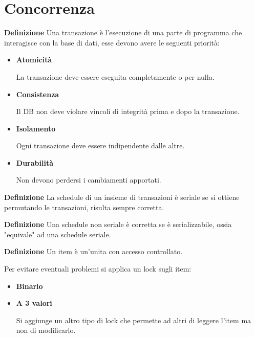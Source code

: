 \documentclass{article}
\begin{document}
\section{Concorrenza}

\textbf{Definizione} Una transazione è l'esecuzione di una parte di programma che interagisce con la base di dati, esse devono avere le seguenti priorità:
\begin{itemize}
    \item \textbf{Atomicità}

        La transazione deve essere eseguita completamente o per nulla.
    
    \item \textbf{Consistenza}

        Il DB non deve violare vincoli di integrità prima e dopo la transazione.
    
    \item \textbf{Isolamento}

        Ogni transazione deve essere indipendente dalle altre.
    
    \item \textbf{Durabilità}

        Non devono perdersi i cambiamenti apportati.\newline
    
\end{itemize}

\noindent\textbf{Definizione} La schedule di un insieme di transazioni è seriale se si ottiene permutando le transazioni, risulta sempre corretta.\newline

\noindent\textbf{Definizione} Una schedule non seriale è corretta se è serializzabile, ossia "equivale" ad una schedule seriale.\newline

\noindent\textbf{Definizione} Un item è un'unita con accesso controllato.\newline

\noindent Per evitare eventuali problemi si applica un lock sugli item:
\begin{itemize}
    \item \textbf{Binario}
    \item \textbf{A 3 valori}

        Si aggiunge un altro tipo di lock che permette ad altri di leggere l'item ma non di modificarlo.
    
\end{itemize}
\end{document}
